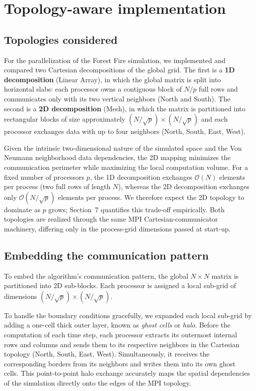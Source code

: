 \section{Topology-aware implementation}

\subsection{Topologies considered}
For the parallelization of the Forest Fire simulation, we implemented and compared two Cartesian decompositions of the global grid. The first is a \textbf{1D decomposition} (Linear Array), in which the global matrix is split into horizontal slabs: each processor owns a contiguous block of $N / p$ full rows and communicates only with its two vertical neighbors (North and South). The second is a \textbf{2D decomposition} (Mesh), in which the matrix is partitioned into rectangular blocks of size approximately $(N / \sqrt{p}) \times (N / \sqrt{p})$ and each processor exchanges data with up to four neighbors (North, South, East, West).

Given the intrinsic two-dimensional nature of the simulated space and the Von Neumann neighborhood data dependencies, the 2D mapping minimizes the communication perimeter while maximizing the local computation volume. For a fixed number of processors $p$, the 1D decomposition exchanges $\mathcal{O}(N)$ elements per process (two full rows of length $N$), whereas the 2D decomposition exchanges only $\mathcal{O}(N / \sqrt{p})$ elements per process. We therefore expect the 2D topology to dominate as $p$ grows; Section~7 quantifies this trade-off empirically. Both topologies are realized through the same MPI Cartesian-communicator machinery, differing only in the process-grid dimensions passed at start-up.

\subsection{Embedding the communication pattern}
To embed the algorithm's communication pattern, the global $N \times N$ matrix is partitioned into 2D sub-blocks. Each processor is assigned a local sub-grid of dimensions $(N / \sqrt{p}) \times (N / \sqrt{p})$. 

To handle the boundary conditions gracefully, we expanded each local sub-grid by adding a one-cell thick outer layer, known as \textit{ghost cells} or \textit{halo}. Before the computation of each time step, each processor extracts its outermost internal rows and columns and sends them to its respective neighbors in the Cartesian topology (North, South, East, West). Simultaneously, it receives the corresponding borders from its neighbors and writes them into its own ghost cells. This point-to-point halo exchange accurately maps the spatial dependencies of the simulation directly onto the edges of the MPI topology.
